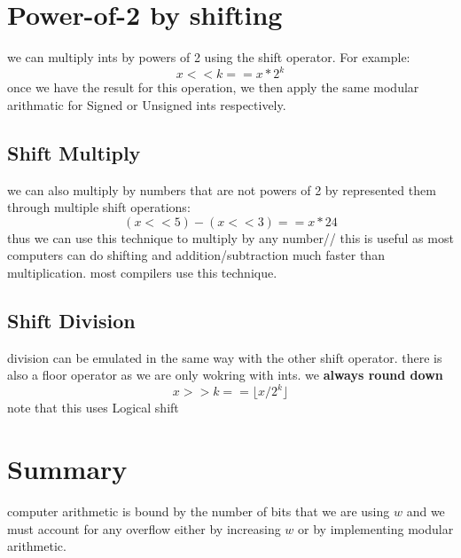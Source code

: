 \documentclass[12pt]{book}
\begin{document}
\section*{Power-of-2 by shifting}
we can multiply ints by powers of 2 using the shift operator. 
For example:
\[x << k == x*2^k\]
once we have the result for this operation, we then apply the same modular arithmatic for Signed or Unsigned ints respectively.

\subsection*{Shift Multiply}
we can also multiply by numbers that are not powers of 2 by represented them through multiple shift operations:
\[(x<<5)-(x<<3) == x*24\]
thus we can use this technique to multiply by any number//
this is useful as most computers can do shifting and addition/subtraction much faster than multiplication.
most compilers use this technique.

\subsection*{Shift Division}
division can be emulated in the same way with the other shift operator. there is also a floor operator as we are
        only wokring with ints. we \textbf{always round down}
\[x>>k == \lfloor x/2^k\rfloor \]
note that this uses Logical shift


\section*{Summary}
computer arithmetic is bound by the number of bits that we are using $w$ and we must account for any overflow either by increasing $w$
or by implementing modular arithmetic.
\end{document}
